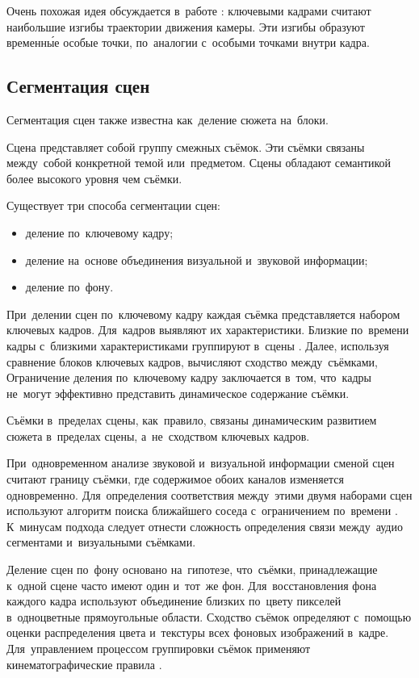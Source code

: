 Очень похожая идея обсуждается в~работе \cite{Han:2005}:
ключевыми кадрами считают наибольшие изгибы траектории движения камеры.
Эти изгибы образуют временны́е особые точки,
по~аналогии с~особыми точками внутри кадра.


\subsection{Сегментация сцен}

Сегментация сцен также известна как~деление сюжета на~блоки.

Сцена представляет собой группу смежных съёмок.
Эти съёмки связаны между~собой конкретной темой или~предметом.
Сцены обладают семантикой более высокого уровня чем съёмки.

Существует три способа сегментации сцен:
\begin{itemize}
    \item деление по~ключевому кадру;
    \item деление на~основе объединения визуальной и~звуковой информации;
    \item деление по~фону.
\end{itemize}

При~делении сцен по~ключевому кадру каждая съёмка представляется набором
ключевых кадров. Для~кадров выявляют их характеристики.
Близкие по~времени кадры с~близкими
характеристиками группируют в~сцены \cite{Truong:2003}.
Далее, используя сравнение блоков ключевых кадров,
вычисляют сходство между~съёмками,
Ограничение деления по~ключевому кадру заключается в~том, что~кадры
не~могут эффективно представить динамическое содержание съёмки.

Съёмки в~пределах сцены, как~правило,
связаны динамическим развитием сюжета в~пределах сцены,
а~не~сходством ключевых кадров.


При~одновременном анализе звуковой и~визуальной информации сменой сцен считают
границу съёмки, где содержимое обоих каналов изменяется одновременно.
Для~определения соответствия между~этими двумя наборами сцен
используют алгоритм поиска ближайшего соседа
с~ограничением по~времени \cite{Sundaram:2000}.
К~минусам подхода следует отнести сложность
определения связи между~аудио сегментами и~визуальными съёмками.

Деление сцен по~фону основано на~гипотезе, что~съёмки,
принадлежащие к~одной сцене часто имеют один и~тот~же фон.
Для~восстановления фона каждого кадра используют объединение
близких по~цвету пикселей в~одноцветные прямоугольные области.
Сходство съёмок определяют с~помощью оценки распределения
цвета и~текстуры всех фоновых изображений в~кадре.
Для~управлением процессом группировки съёмок
применяют кинематографические правила \cite{Chen:2008}.

